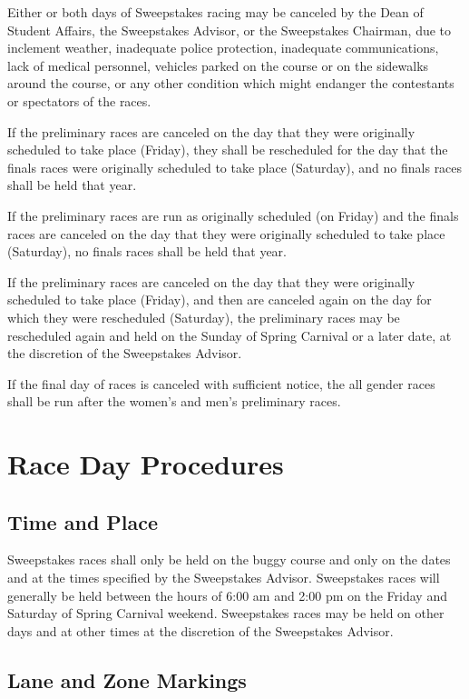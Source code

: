 	Either or both days of Sweepstakes racing may be canceled by the Dean of Student Affairs, the Sweepstakes Advisor, or the Sweepstakes Chairman, due to inclement weather, inadequate police protection, inadequate communications, lack of medical personnel, vehicles parked on the course or on the sidewalks around the course, or any other condition which might endanger the contestants or spectators of the races.

	If the preliminary races are canceled on the day that they were originally scheduled to take place (Friday), they shall be rescheduled for the day that the finals races were originally scheduled to take place (Saturday), and no finals races shall be held that year.

	If the preliminary races are run as originally scheduled (on Friday) and the finals races are canceled on the day that they were originally scheduled to take place (Saturday), no finals races shall be held that year.

	If the preliminary races are canceled on the day that they were originally scheduled to take place (Friday), and then are canceled again on the day for which they were rescheduled (Saturday), the preliminary races may be rescheduled again and held on the Sunday of Spring Carnival or a later date, at the discretion of the Sweepstakes Advisor.

	If the final day of races is canceled with sufficient notice, the all gender races shall be run after the women’s and men’s preliminary races.

\section{Race Day Procedures}

\subsection{Time and Place}

	Sweepstakes races shall only be held on the buggy course and only on the dates and at the times specified by the Sweepstakes Advisor. Sweepstakes races will generally be held between the hours of 6:00 am and 2:00 pm on the Friday and Saturday of Spring Carnival weekend. Sweepstakes races may be held on other days and at other times at the discretion of the Sweepstakes Advisor.

\subsection{Lane and Zone Markings}
\label{subsec:Lanes}

